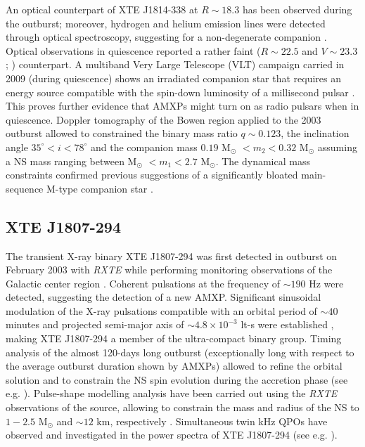 \documentclass[graybox]{svmult}
\def \rxte {{\em RXTE\xspace}}
\begin{document}
An optical counterpart of XTE J1814-338 at $R\sim18.3$ has been observed during the outburst; moreover, hydrogen and helium emission lines were detected through optical spectroscopy, suggesting for a non-degenerate companion \cite{Krauss2005}. 
Optical observations in quiescence reported a rather faint ($R\sim22.5$ and $V\sim23.3$; \cite{DAvanzo2009}) counterpart.
A multiband Very Large Telescope (VLT) campaign carried in 2009 (during quiescence) shows an irradiated companion star that requires an energy source compatible with the spin-down luminosity of a millisecond pulsar \cite{Baglio2013}. This proves further evidence that AMXPs might turn on as radio pulsars when in quiescence. Doppler tomography of the Bowen region applied to the 2003 outburst allowed to constrained the binary mass ratio  $q\sim0.123$, the inclination angle $35^\circ<i<78^\circ$ and the companion mass $0.19$ M$_\odot$ $<m_2<0.32$ M$_\odot$ assuming a NS mass ranging between M$_\odot$ $<m_1<2.7$ M$_\odot$. The dynamical mass constraints confirmed previous suggestions of a significantly bloated main-sequence M-type companion star \cite{Wang2017}.

\subsection{XTE J1807-294}

The transient X-ray binary XTE J1807-294 was first detected in outburst on February 2003 with \rxte{} while performing monitoring observations of the Galactic center region \cite{Markwardt2003}. Coherent pulsations at the frequency of $\sim190$ Hz were detected, suggesting the detection of a new AMXP. Significant sinusoidal modulation of the X-ray pulsations compatible with an orbital period of $\sim40$ minutes and projected semi-major axis of $\sim4.8\times 10^{-3}$ lt-s were established \cite{Markwardt2003b}, making XTE J1807-294 a member of the ultra-compact binary group. Timing analysis of the almost 120-days long outburst (exceptionally long with respect to the average outburst duration shown by AMXPs) allowed to refine the orbital solution and to constrain the NS spin evolution during the accretion phase (see e.g. \cite{Kirsch2004,Riggio2007,Riggio2008,Chou2008,Patruno2010b}). Pulse-shape modelling analysis have been carried out using the \rxte{} observations of the source, allowing to constrain the mass and radius of the NS to $1-2.5$ M$_\odot$ and $\sim12$ km, respectively \cite{Leahy2011}. Simultaneous twin kHz QPOs have observed and investigated in the power spectra of XTE J1807-294 (see e.g. \cite{Linares2005,Zhang2008,Tasheva2018}). 
\end{document}
